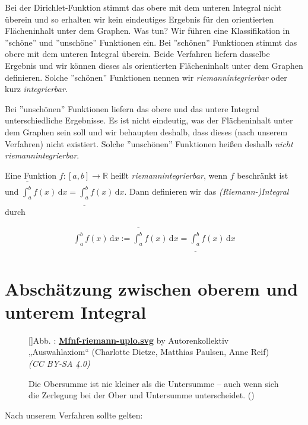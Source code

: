 \documentclass[fontsize=9pt,
               parskip=half-,
               DIV=14,
               listof=chapterentry,
               tocflat]{scrbook}
\newcounter{imagelabel}
\begin{document}
Bei der Dirichlet-Funktion stimmt das obere mit dem unteren Integral nicht überein und so erhalten wir kein eindeutiges Ergebnis für den orientierten Flächeninhalt unter dem Graphen. Was tun? Wir führen eine Klassifikation in {''}schöne{''} und {''}unschöne{''} Funktionen ein. Bei {''}schönen{''} Funktionen stimmt das obere mit dem unteren Integral überein. Beide Verfahren liefern dasselbe Ergebnis und wir können dieses als orientierten Flächeninhalt unter dem Graphen definieren. Solche {''}schönen{''} Funktionen nennen wir \emph{riemannintegrierbar} oder kurz \emph{integrierbar}.

Bei {''}unschönen{''} Funktionen liefern das obere und das untere Integral unterschiedliche Ergebnisse. Es ist nicht eindeutig, was der Flächeninhalt unter dem Graphen sein soll und wir behaupten deshalb, dass dieses (nach unserem Verfahren) nicht existiert. Solche {''}unschönen{''} Funktionen heißen deshalb \emph{nicht riemannintegrierbar}.

\begin{definition*}[Riemannintegral]
Eine Funktion $f:[a,b]\to \mathbb {R} $ heißt \emph{riemannintegrierbar}, wenn $f$ beschränkt ist und ${\overline {\int _{a}^{b}}}f(x)\,\mathrm {d} x={\underline {\int _{a}^{b}}}f(x)\,\mathrm {d} x$. Dann definieren wir das \emph{(Riemann-)Integral} durch

\begin{align*}
\int _{a}^{b}f(x)\,\mathrm {d} x:={\overline {\int _{a}^{b}}}f(x)\,\mathrm {d} x={\underline {\int _{a}^{b}}}f(x)\,\mathrm {d} x
\end{align*}

\end{definition*}

\section{Abschätzung zwischen oberem und unterem Integral}

\begin{figure}[h]
\vspace{\baselineskip}
[]{Abb. : \protect\href{https://commons.wikimedia.org/wiki/File:Mfnf-riemann-uplo.svg}{\textbf{Mfnf\allowbreak-riemann\allowbreak-uplo.svg}} by Autorenkollektiv „Auswahlaxiom“ (Charlotte Dietze, Matthias Paulsen, Anne Reif) \textit{(CC BY-SA 4.0)}}\centering
{}
\caption*{Die Obersumme ist nie kleiner als die Untersumme – auch wenn sich die Zerlegung bei der Ober und Untersumme unterscheidet. ()}
\end{figure}
Nach unserem Verfahren sollte gelten:
\end{document}
